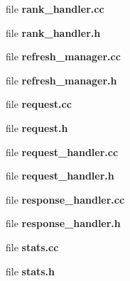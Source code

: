 \begin{CompactItemize}
file {\bf rank\_\-handler.cc}
\item 
file {\bf rank\_\-handler.h}
\item 
file {\bf refresh\_\-manager.cc}
\item 
file {\bf refresh\_\-manager.h}
\item 
file {\bf request.cc}
\item 
file {\bf request.h}
\item 
file {\bf request\_\-handler.cc}
\item 
file {\bf request\_\-handler.h}
\item 
file {\bf response\_\-handler.cc}
\item 
file {\bf response\_\-handler.h}
\item 
file {\bf stats.cc}
\item 
file {\bf stats.h}
\end{CompactItemize}
